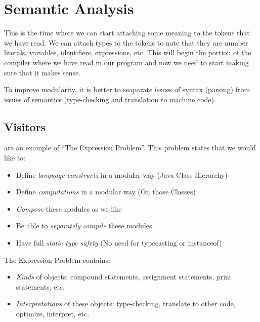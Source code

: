 \section{Semantic Analysis}\label{sec:Semantic_Analysis}
This is the time where we can start attaching some meaning to the tokens that we have read.
We can attach types to the tokens to note that they are number literals, variables, identifiers, expressions, etc.
This will begin the portion of the compiler where we have read in our program and now we need to start making sure that it makes sense.

To improve modularity, it is better to seaparate issues of syntax (parsing) from issues of semantics (type-checking and translation to machine code).

\subsection{Visitors}\label{subsec:Visitors}
 are an example of ``The Expression Problem''.
This problem states that we would like to:
\begin{itemize}[noitemsep]
\item Define \emph{language constructs} in a modular way (Java Class Hierarchy)
\item Define \emph{computations} in a modular way (On those Classes)
\item \emph{Compose} these modules as we like
\item Be able to \emph{separately compile} these modules
\item Have full \emph{static type safety} (No need for typecasting or instanceof)
\end{itemize}

The Expression Problem contains:
\begin{itemize}[noitemsep]
\item \textit{Kinds} of objects: compound statements, assignment statements, print statements, etc.
\item \textit{Interpretations} of these objects: type-checking, translate to other code, optimize, interpret, etc.
\end{itemize}

